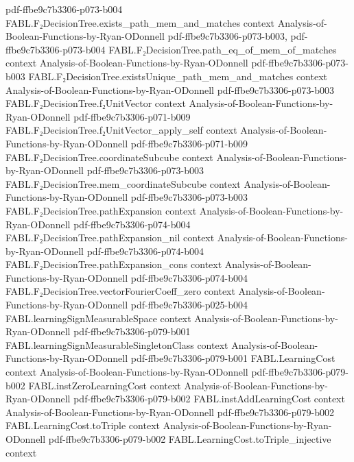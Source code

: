 \begin{theorem}
  {pdf-ffbe9c7b3306-p073-b004}
\proofstep
  {FABL.F₂DecisionTree.exists_path_mem_and_matches}
  {context}
  {Analysis-of-Boolean-Functions-by-Ryan-ODonnell}
  {pdf-ffbe9c7b3306-p073-b003,
    pdf-ffbe9c7b3306-p073-b004}
\proofstep
  {FABL.F₂DecisionTree.path_eq_of_mem_of_matches}
  {context}
  {Analysis-of-Boolean-Functions-by-Ryan-ODonnell}
  {pdf-ffbe9c7b3306-p073-b003}
\proofstep
  {FABL.F₂DecisionTree.existsUnique_path_mem_and_matches}
  {context}
  {Analysis-of-Boolean-Functions-by-Ryan-ODonnell}
  {pdf-ffbe9c7b3306-p073-b003}
\proofstep
  {FABL.F₂DecisionTree.f₂UnitVector}
  {context}
  {Analysis-of-Boolean-Functions-by-Ryan-ODonnell}
  {pdf-ffbe9c7b3306-p071-b009}
\proofstep
  {FABL.F₂DecisionTree.f₂UnitVector_apply_self}
  {context}
  {Analysis-of-Boolean-Functions-by-Ryan-ODonnell}
  {pdf-ffbe9c7b3306-p071-b009}
\proofstep
  {FABL.F₂DecisionTree.coordinateSubcube}
  {context}
  {Analysis-of-Boolean-Functions-by-Ryan-ODonnell}
  {pdf-ffbe9c7b3306-p073-b003}
\proofstep
  {FABL.F₂DecisionTree.mem_coordinateSubcube}
  {context}
  {Analysis-of-Boolean-Functions-by-Ryan-ODonnell}
  {pdf-ffbe9c7b3306-p073-b003}
\proofstep
  {FABL.F₂DecisionTree.pathExpansion}
  {context}
  {Analysis-of-Boolean-Functions-by-Ryan-ODonnell}
  {pdf-ffbe9c7b3306-p074-b004}
\proofstep
  {FABL.F₂DecisionTree.pathExpansion_nil}
  {context}
  {Analysis-of-Boolean-Functions-by-Ryan-ODonnell}
  {pdf-ffbe9c7b3306-p074-b004}
\proofstep
  {FABL.F₂DecisionTree.pathExpansion_cons}
  {context}
  {Analysis-of-Boolean-Functions-by-Ryan-ODonnell}
  {pdf-ffbe9c7b3306-p074-b004}
\proofstep
  {FABL.F₂DecisionTree.vectorFourierCoeff_zero}
  {context}
  {Analysis-of-Boolean-Functions-by-Ryan-ODonnell}
  {pdf-ffbe9c7b3306-p025-b004}
\proofstep
  {FABL.learningSignMeasurableSpace}
  {context}
  {Analysis-of-Boolean-Functions-by-Ryan-ODonnell}
  {pdf-ffbe9c7b3306-p079-b001}
\proofstep
  {FABL.learningSignMeasurableSingletonClass}
  {context}
  {Analysis-of-Boolean-Functions-by-Ryan-ODonnell}
  {pdf-ffbe9c7b3306-p079-b001}
\proofstep
  {FABL.LearningCost}
  {context}
  {Analysis-of-Boolean-Functions-by-Ryan-ODonnell}
  {pdf-ffbe9c7b3306-p079-b002}
\proofstep
  {FABL.instZeroLearningCost}
  {context}
  {Analysis-of-Boolean-Functions-by-Ryan-ODonnell}
  {pdf-ffbe9c7b3306-p079-b002}
\proofstep
  {FABL.instAddLearningCost}
  {context}
  {Analysis-of-Boolean-Functions-by-Ryan-ODonnell}
  {pdf-ffbe9c7b3306-p079-b002}
\proofstep
  {FABL.LearningCost.toTriple}
  {context}
  {Analysis-of-Boolean-Functions-by-Ryan-ODonnell}
  {pdf-ffbe9c7b3306-p079-b002}
\proofstep
  {FABL.LearningCost.toTriple_injective}
  {context}

\end{theorem}
